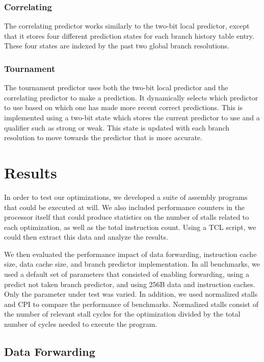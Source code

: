 \documentclass[conference, hidelinks]{IEEEtran}
\begin{document}
\subsubsection{Correlating}

The correlating predictor works similarly to the two-bit local predictor, except that it stores four different prediction states for each branch history table entry. These four states are indexed by the past two global branch resolutions.

\subsubsection{Tournament}

The tournament predictor uses both the two-bit local predictor and the correlating predictor to make a prediction. It dynamically selects which predictor to use based on which one has made more recent correct predictions. This is implemented using a two-bit state which stores the current predictor to use and a qualifier such as strong or weak. This state is updated with each branch resolution to move towards the predictor that is more accurate.

\section{Results}

In order to test our optimizations, we developed a suite of assembly programs that could be executed at will. We also included performance counters in the processor itself that could produce statistics on the number of stalls related to each optimization, as well as the total instruction count. Using a TCL script, we could then extract this data and analyze the results.

We then evaluated the performance impact of data forwarding, instruction cache size, data cache size, and branch predictor implementation. In all benchmarks, we used a default set of parameters that consisted of enabling forwarding, using a predict not taken branch predictor, and using 256B data and instruction caches. Only the parameter under test was varied. In addition, we used normalized stalls and CPI to compare the performance of benchmarks. Normalized stalls consist of the number of relevant stall cycles for the optimization divided by the total number of cycles needed to execute the program.

\subsection{Data Forwarding}
\end{document}
